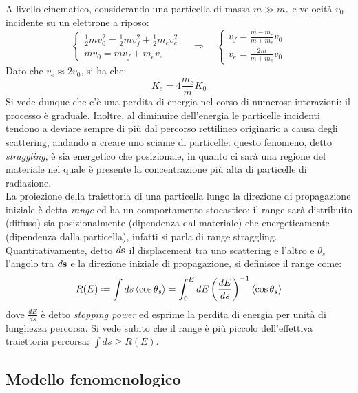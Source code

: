 A livello cinematico, considerando una particella di massa $ m \gg m_e $ e velocità $ v_0 $ incidente su un elettrone a riposo:
\begin{equation*}
	\begin{cases}
		\frac{1}{2} m v_0^2 = \frac{1}{2} m v_f^2 + \frac{1}{2} m_e v_e^2 \\
		m v_0 = m v_f + m_e v_e
	\end{cases}
	\quad\Rightarrow\quad
	\begin{cases}
		v_f = \frac{m - m_e}{m + m_e} v_0 \\
		v_e = \frac{2m}{m + m_e} v_0
	\end{cases}
\end{equation*}
Dato che $ v_e \approx 2v_0 $, si ha che:
\begin{equation}
	K_e = 4 \frac{m_e}{m} K_0
	\label{eq:3.2}
\end{equation}
Si vede dunque che c'è una perdita di energia nel corso di numerose interazioni: il processo è graduale. Inoltre, al diminuire dell'energia le particelle incidenti tendono a deviare sempre di più dal percorso rettilineo originario a causa degli scattering, andando a creare uno sciame di particelle: questo fenomeno, detto \textit{straggling}, è sia energetico che posizionale, in quanto ci sarà una regione del materiale nel quale è presente la concentrazione più alta di particelle di radiazione.\\
La proiezione della traiettoria di una particella lungo la direzione di propagazione iniziale è detta \textit{range} ed ha un comportamento stocastico: il range sarà distribuito (diffuso) sia posizionalmente (dipendenza dal materiale) che energeticamente (dipendenza dalla particella), infatti si parla di range straggling. Quantitativamente, detto $ d\mathbf{s} $ il displacement tra uno scattering e l'altro e $ \theta_s $ l'angolo tra $ d\mathbf{s} $ e la direzione iniziale di propagazione, si definisce il range come:
\begin{equation}
	R(E) \defeq \int ds \braket{\cos \theta_s} = \int_0^E dE \left( \frac{dE}{ds} \right)^{-1} \braket{\cos \theta_s}
	\label{eq:}
\end{equation}
dove $ \frac{dE}{ds} $ è detto \textit{stopping power} ed esprime la perdita di energia per unità di lunghezza percorsa. Si vede subito che il range è più piccolo dell'effettiva traiettoria percorsa: $ \int ds \ge R(E) $.

\subsection{Modello fenomenologico}

